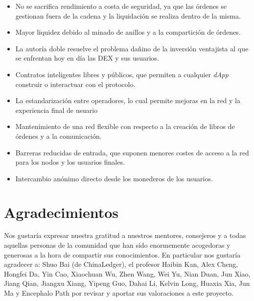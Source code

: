 \documentclass[UTF8,nofonts]{article}
\begin{document}
\begin{multicols}{2}
\begin{itemize}
	\item No se sacrifica rendimiento a costa de seguridad, ya que las órdenes se gestionan fuera de la cadena y la liquidación se realiza dentro de la misma.
	\item Mayor liquidez debido al minado de anillos y a la compartición de órdenes.
	\item La autoría doble resuelve el problema dañino de la inversión ventajista al que se enfrentan hoy en día las DEX y sus usuarios.
	\item Contratos inteligentes libres y públicos, que permiten a cualquier \textit{dApp} construir o interactuar con el protocolo.
	\item La estandarización entre operadores, lo cual permite mejoras en la red y la experiencia final de usuario
	\item Mantenimiento de una red flexible con respecto a la creación de libros de órdenes y a la comunicación.
	\item Barreras reducidas de entrada, que suponen menores costes de acceso a la red para los nodos y los usuarios finales.
	\item Intercambio anónimo directo desde los monederos de los usuarios.
\end{itemize}

\section{Agradecimientos}
Nos gustaría expresar nuestra gratitud a nuestros mentores, consejeros y a todas aquellas personas de la comunidad que han sido enormemente acogedoras y generosas a la hora de compartir sus conocimientos. En particular nos gustaría agradecer a: Shuo Bai (de ChinaLedger), el profesor Haibin Kan, Alex Cheng, Hongfei Da, Yin Cao, Xiaochuan Wu, Zhen Wang, Wei Yu, Nian Duan, Jun Xiao, Jiang Qian, Jiangxu Xiang, Yipeng Guo, Dahai Li, Kelvin Long, Huaxia Xia, Jun Ma y Encephalo Path por revisar y aportar sus valoraciones a este proyecto.






\end{multicols}
\end{document}
